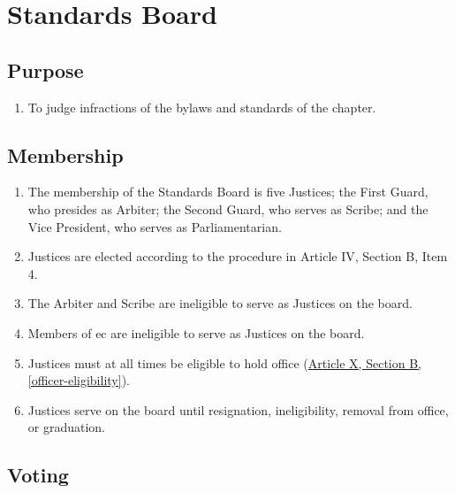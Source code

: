 \chapter{Standards Board}
\label{stds-board}

\section{Purpose}
	\begin{enumerate}
		\item To judge infractions of the bylaws and standards of the chapter.
	\end{enumerate}

\section{Membership}

	\begin{enumerate}
		\item The membership of the Standards Board is five Justices; the First Guard, who presides as Arbiter; the Second Guard, who serves as Scribe; and the Vice President, who serves as Parliamentarian.
        \item Justices are elected according to the procedure in Article IV, Section B, Item 4.
        \item The Arbiter and Scribe are ineligible to serve as Justices on the board.
		\item Members of \gls{ec} are ineligible to serve as Justices on the board.
		\item Justices must at all times be eligible to hold office (\hyperref[officer-eligibility]{Article X, Section B, \autoref*{officer-eligibility}}). 
		\item Justices serve on the board until resignation, ineligibility, removal from office, or graduation. \label{justice-term}
	\end{enumerate}

\section{Voting}

